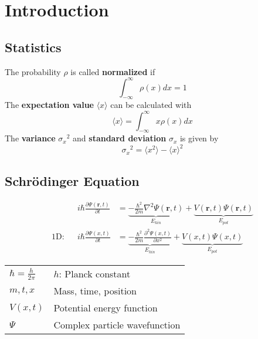 \section{Introduction}
\subsection{Statistics}
The probability $\rho$ is called \textbf{normalized} if
\begin{equation*}
    \int_{-\infty}^{\infty}\rho(x)dx = 1
\end{equation*}
The \textbf{expectation value} $\langle x \rangle$ can be calculated with
\begin{equation*}
    \langle x \rangle = \int_{-\infty}^{\infty} x\rho(x) dx
\end{equation*}
The \textbf{variance} ${\sigma_x}^2$ and \textbf{standard deviation} $\sigma_x$ is given by
\begin{equation*}
    {\sigma_x}^2 = \langle x^2 \rangle - {\langle x \rangle }^2
\end{equation*}

\subsection{Schrödinger Equation}
\begin{align*}
               &  & i\hbar \frac{\partial \Psi(\mathbf{r},t)}{\partial t} & = \underbrace{- \frac{\hbar^2}{2m} \nabla^2 \Psi(\mathbf{r},t)}_{E_{kin}} + \underbrace{V(\mathbf{r},t)\Psi(\mathbf{r},t)}_{E_{pot}} \\
    \text{1D:} &  & i\hbar \frac{\partial \Psi(x,t)}{\partial t}          & = \underbrace{- \frac{\hbar^2}{2m} \frac{\partial^2 \Psi(x,t)}{\partial x^2}}_{E_{kin}} + \underbrace{V(x,t)\Psi(x,t)}_{E_{pot}}
\end{align*}

\renewcommand{\arraystretch}{1.3}
\setlength\tabcolsep{6pt} %
\begin{tabularx}{\linewidth}{@{}ll@{}}
    $\hbar = \frac{h}{2\pi}$ & $h$: Planck constant             \\
    $m,t,x$                  & Mass, time, position          \\
    $V(x,t)$                 & Potential energy function     \\
    $\Psi$                   & Complex particle wavefunction \\
\end{tabularx}
\renewcommand{\arraystretch}{1}
\setlength\tabcolsep{6pt} %

